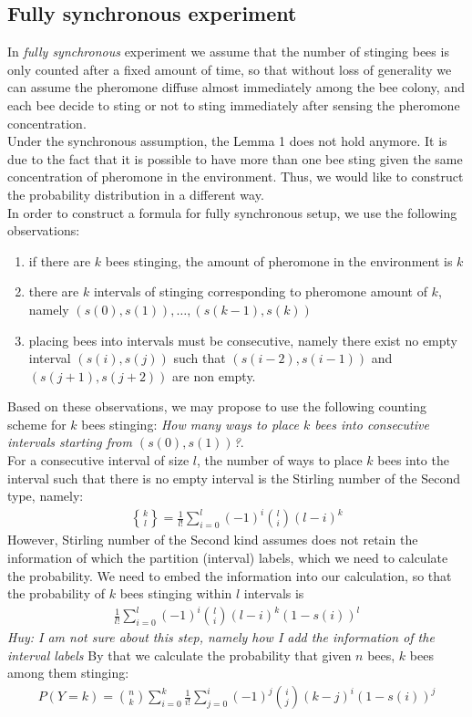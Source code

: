 \documentclass[12pt]{article}
\newcommand{\stirlingii}{\genfrac{\{}{\}}{0pt}{}}
\begin{document}
\subsection{Fully synchronous experiment}
In \textit{fully synchronous} experiment we assume that the number of stinging
bees is only counted after a fixed amount of time, so that without loss of
generality we can assume the pheromone diffuse almost immediately among the bee
colony, and each bee decide to sting or not to sting immediately after sensing
the pheromone concentration.\\
Under the synchronous assumption, the Lemma 1 does not hold anymore. It is due
to the fact that it is possible to have more than one bee sting given the same
concentration of pheromone in the environment. Thus, we would like to construct
the probability distribution in a different way.\\
In order to construct a formula for fully synchronous setup, we use the
following observations:
\begin{enumerate}
\item if there are $k$ bees stinging, the amount of pheromone in the environment
  is $k$
\item there are $k$ intervals of stinging corresponding to pheromone
  amount of $k$, namely $(s(0),s(1)),\ldots,(s(k-1),s(k))$
\item placing bees into intervals must be consecutive, namely there exist no empty
  interval $(s(i),s(j))$ such that $(s(i-2),s(i-1))$ and $(s(j+1),s(j+2))$ are
  non empty.
\end{enumerate}
Based on these observations, we may propose to use the following counting
scheme for $k$ bees stinging: \textit{How many ways to place $k$ bees into
  consecutive intervals starting from $(s(0),s(1))$?}.\\
For a consecutive interval of size $l$, the number of ways to place $k$ bees
into the interval such that there is no empty interval is the Stirling number of
the Second type, namely:
\begin{align*}
  \stirlingii{k}{l} = \frac{1}{l!}\sum_{i=0}^{l}(-1)^i\binom{l}{i} (l - i)^k
\end{align*}
However, Stirling number of the Second kind assumes does not retain the
information of which the partition (interval) labels, which we need to calculate
the probability. We need to embed the information into our calculation, so that
the probability of $k$ bees stinging within $l$ intervals is 
\begin{align*}
  \frac{1}{l!}\sum_{i=0}^{l}(-1)^i\binom{l}{i} (l - i)^k (1-s(i))^l
\end{align*}
\textit{Huy: I am not sure about this step, namely how I add the information of
  the interval labels}
By that we calculate the probability that given $n$ bees, $k$ bees among
them stinging:
\begin{align*}
  P(Y=k) = \binom{n}{k} \sum_{i=0}^{k} \frac{1}{i!}\sum_{j=0}^{i}(-1)^j\binom{i}{j} (k - j)^i (1-s(i))^j
\end{align*}
\end{document}
